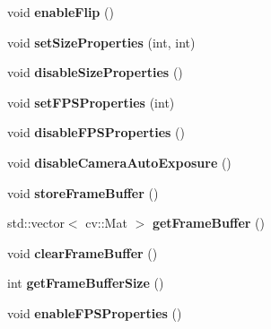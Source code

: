 \begin{DoxyCompactItemize}
\mbox{\label{classcapture__camera_a0c34de9b109ac6c8b6d178d72d180f99}} 
void {\bfseries enable\+Flip} ()
\item 
\mbox{\label{classcapture__camera_a87fe0d7ba5860e8513e0815ff2657330}} 
void {\bfseries set\+Size\+Properties} (int, int)
\item 
\mbox{\label{classcapture__camera_af9bbc46c263040e51d130ed6710975df}} 
void {\bfseries disable\+Size\+Properties} ()
\item 
\mbox{\label{classcapture__camera_a93dac0eb61e7b728abe9a30651d880bd}} 
void {\bfseries set\+F\+P\+S\+Properties} (int)
\item 
\mbox{\label{classcapture__camera_a032bef7d391b22058b88b9638f56ee16}} 
void {\bfseries disable\+F\+P\+S\+Properties} ()
\item 
\mbox{\label{classcapture__camera_ae5e6cc89e00e0149125e7d97b11433bf}} 
void {\bfseries disable\+Camera\+Auto\+Exposure} ()
\item 
\mbox{\label{classcapture__camera_aed9bbe364c00d4ba6f2ab435baa21c0c}} 
void {\bfseries store\+Frame\+Buffer} ()
\item 
\mbox{\label{classcapture__camera_a138168ea2f09cd1f0753b507f4348018}} 
std\+::vector$<$ cv\+::\+Mat $>$ {\bfseries get\+Frame\+Buffer} ()
\item 
\mbox{\label{classcapture__camera_ae4b6748aac8dc43ac19c5f2cd3caad85}} 
void {\bfseries clear\+Frame\+Buffer} ()
\item 
\mbox{\label{classcapture__camera_a5bb4e8ef9efc183833cd7b13cb0f6340}} 
int {\bfseries get\+Frame\+Buffer\+Size} ()
\item 
\mbox{\label{classcapture__camera_aa133becc1d35821c17157b164ec6942d}} 
void {\bfseries enable\+F\+P\+S\+Properties} ()
\end{DoxyCompactItemize}
